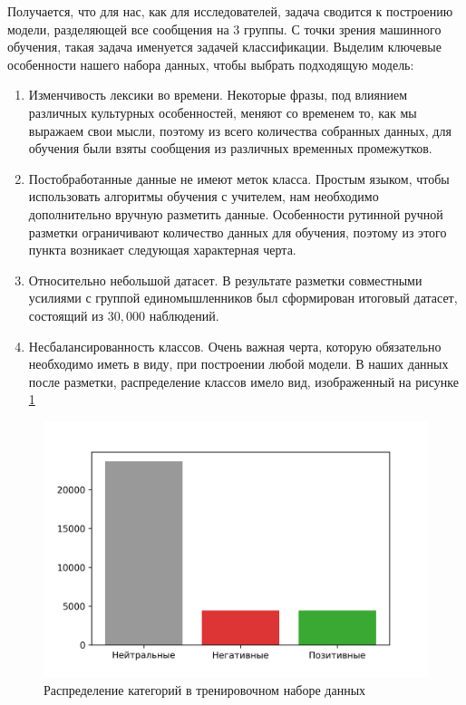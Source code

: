 \documentclass{article}
\begin{document}
Получается, что для нас, как для исследователей, задача сводится к построению модели, разделяющей все сообщения на 3 группы. С точки зрения машинного обучения, такая задача именуется задачей классификации. Выделим ключевые особенности нашего набора данных, чтобы выбрать подходящую модель:

\begin{enumerate}
	\item Изменчивость лексики во времени. Некоторые фразы, под влиянием различных культурных особенностей, меняют со временем то, как мы выражаем свои мысли, поэтому из всего количества собранных данных, для обучения были взяты сообщения из различных временных промежутков.
	\item Постобработанные данные не имеют меток класса. Простым языком, чтобы использовать алгоритмы обучения с учителем, нам необходимо дополнительно вручную разметить данные. Особенности рутинной ручной разметки ограничивают количество данных для обучения, поэтому из этого пункта возникает следующая характерная черта.
	\item Относительно небольшой датасет. В результате разметки совместными усилиями с группой единомышленников был сформирован итоговый датасет, состоящий из $30,000$ наблюдений.
	\item Несбалансированность классов. Очень важная черта, которую обязательно необходимо иметь в виду, при построении любой модели. В наших данных после разметки, распределение классов имело вид, изображенный на рисунке 	\ref{pic:imb}
\end{enumerate}

\begin{figure}[h]
	\centering
	\includegraphics[scale=0.65]{imbalance.png}
	\caption{Распределение категорий в тренировочном наборе данных}
	\label{pic:imb}
\end{figure}
\end{document}
